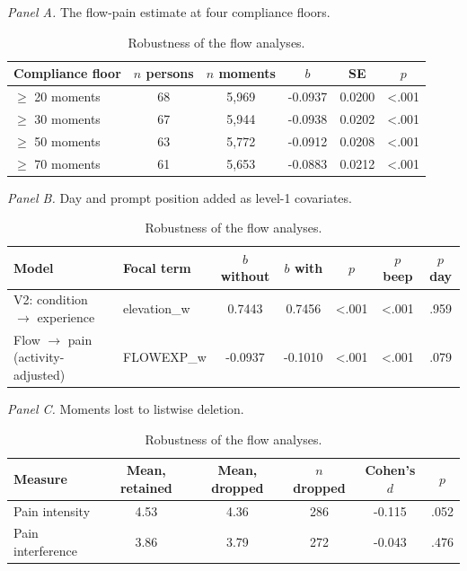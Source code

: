 \begin{table}[!htbp]
\raggedright
\caption{Robustness of the flow analyses.}
\label{tab:sup-robustness}
\footnotesize
\begingroup
\setlength{\tabcolsep}{4pt}
\renewcommand{\arraystretch}{1.08}
\noindent\textit{Panel A.} The flow-pain estimate at four compliance floors.\par\vspace{2pt}
\begin{tabular*}{\textwidth}{@{\extracolsep{\fill}}lccccc@{}}
\toprule
Compliance floor & $n$ persons & $n$ moments & $b$ & SE & $p$ \\
\midrule
$\geq$ 20 moments & 68 & 5,969 & -0.0937 & 0.0200 & <.001 \\
$\geq$ 30 moments & 67 & 5,944 & -0.0938 & 0.0202 & <.001 \\
$\geq$ 50 moments & 63 & 5,772 & -0.0912 & 0.0208 & <.001 \\
$\geq$ 70 moments & 61 & 5,653 & -0.0883 & 0.0212 & <.001 \\
\bottomrule
\end{tabular*}
\par\vspace{6pt}\noindent\textit{Panel B.} Day and prompt position added as level-1 covariates.\par\vspace{2pt}
\begin{tabular*}{\textwidth}{@{\extracolsep{\fill}}llccccc@{}}
\toprule
Model & Focal term & $b$ without & $b$ with & $p$ & $p$ beep & $p$ day \\
\midrule
V2: condition $\rightarrow$ experience & elevation\_w & 0.7443 & 0.7456 & <.001 & <.001 & .959 \\
Flow $\rightarrow$ pain (activity-adjusted) & FLOWEXP\_w & -0.0937 & -0.1010 & <.001 & <.001 & .079 \\
\bottomrule
\end{tabular*}
\par\vspace{6pt}\noindent\textit{Panel C.} Moments lost to listwise deletion.\par\vspace{2pt}
\begin{tabular*}{\textwidth}{@{\extracolsep{\fill}}lccccc@{}}
\toprule
Measure & Mean, retained & Mean, dropped & $n$ dropped & Cohen's $d$ & $p$ \\
\midrule
Pain intensity & 4.53 & 4.36 & 286 & -0.115 & .052 \\
Pain interference & 3.86 & 3.79 & 272 & -0.043 & .476 \\

\end{tabular*}
\end{table}
